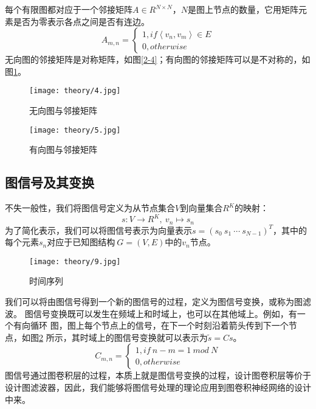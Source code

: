 每个有限图都对应于一个邻接矩阵$A \in R^{N \times N}$，$N$是图上节点的数量，它用矩阵元素是否为零表示各点之间是否有连边。
\begin{equation*}
    A_{m,n} = \begin{cases}1,if\left \langle v_{n}, v_{m} \right \rangle  \in E
     \\0,otherwise
    \end{cases}
\end{equation*}
无向图的邻接矩阵是对称矩阵，如图\ref{2-4}；有向图的邻接矩阵可以是不对称的，如图\ref{2-5}。

\begin{figure}[htbp]
    \centering
    \begin{minipage}[t]{0.48\textwidth}
    \centering
    \captionsetup{width=6cm}
    \texttt{[image: theory/4.jpg]}
    \caption{\label{2-4}无向图与邻接矩阵}
    \end{minipage}
    \begin{minipage}[t]{0.48\textwidth}
    \centering
    \captionsetup{width=6cm}
    \texttt{[image: theory/5.jpg]}
    \caption{\label{2-5}有向图与邻接矩阵}
    \end{minipage}
\end{figure}

\subsection{图信号及其变换}
不失一般性，我们将图信号定义为从节点集合$V$到向量集合$ R^{K} $的映射：
$$ s : V\to R^{K}, \ v_{n} \mapsto s_{n} $$
为了简化表示，我们可以将图信号表示为向量表示$ s = (s_0 \ s_1 \ \cdots  \ s_{N-1})^{T}$，其中的
每个元素$ s_{n} $对应于已知图结构$\ G = (V , E) $中的$ v_{n} $节点。

\begin{figure}[ht]
    \centering
    \texttt{[image: theory/9.jpg]}
    \caption{\label{2-9}时间序列}
\end{figure}
我们可以将由图信号得到一个新的图信号的过程，定义为图信号变换，或称为图滤波。
图信号变换既可以发生在频域上和时域上，也可以在其他域上。例如，有一个有向循环
图，图上每个节点上的信号，在下一个时刻沿着箭头传到下一个节点，如图\ref{2-9}
所示，其时域上的图信号变换就可以表示为$ \tilde{s} = Cs  $。
\begin{equation*}
    C_{m,n} = \begin{cases}1,if \ n - m = 1 \ mod \ N
    \\0,otherwise
    \end{cases}
\end{equation*}
图信号通过图卷积层的过程，本质上就是图信号变换的过程，设计图卷积层等价于
设计图滤波器，因此，我们能够将图信号处理的理论应用到图卷积神经网络的设计中来。

